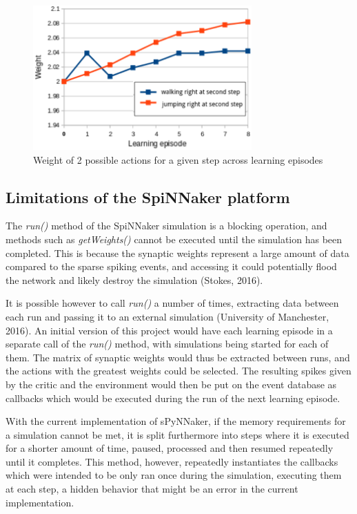 \documentclass[10pt]{article}
\begin{document}
    \begin{figure}[ht!]
    \centering
    \includegraphics[width=84mm]{./learning.png}
    \caption{Weight of 2 possible actions for a given step across learning episodes}
    \label{fig:learning}
    \end{figure}

    \subsection{Limitations of the SpiNNaker platform}

    The \textit{run()} method of the SpiNNaker simulation is a blocking operation, and methods such as \textit{getWeights()} cannot be executed until the simulation has been completed. This is because the synaptic weights represent a large amount of data compared to the sparse spiking events, and accessing it could potentially flood the network and likely destroy the simulation (Stokes, 2016).

    It is possible however to call \textit{run()} a number of times, extracting data between each run and passing it to an external simulation (University of Manchester, 2016). An initial version of this project would have each learning episode in a separate call of the \textit{run()} method, with simulations being started for each of them. The matrix of synaptic weights would thus be extracted between runs, and the actions with the greatest weights could be selected. The resulting spikes given by the critic and the environment would then be put on the event database as callbacks which would be executed during the run of the next learning episode.
    
    With the current implementation of sPyNNaker, if the memory requirements for a simulation cannot be met, it is split furthermore into steps where it is executed for a shorter amount of time, paused, processed and then resumed repeatedly until it completes. This method, however, repeatedly instantiates the callbacks which were intended to be only ran once during the simulation, executing them at each step, a hidden behavior that might be an error in the current implementation.
    
\end{document}
